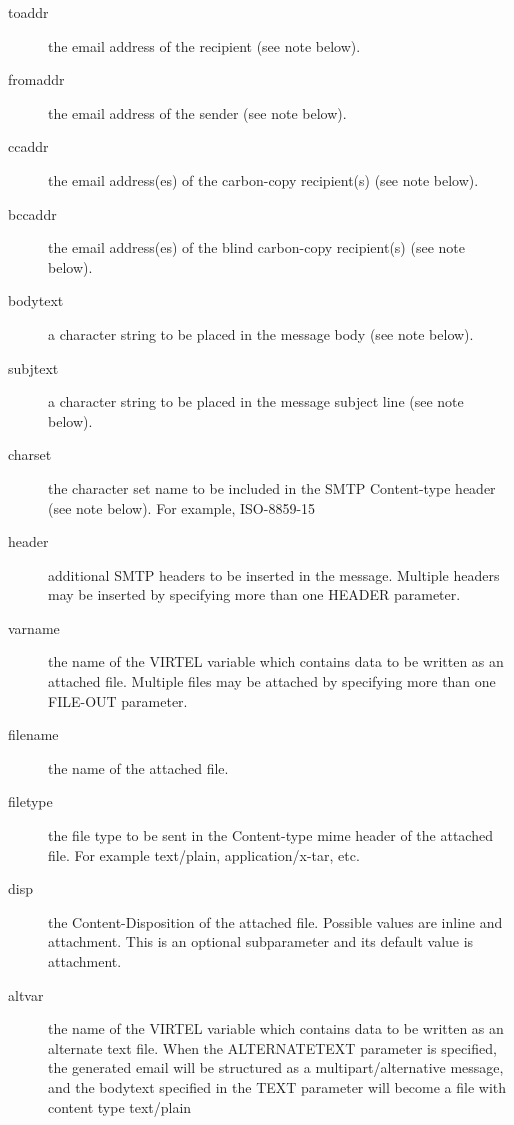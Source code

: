 \documentclass[letterpaper,10pt,english]{sphinxmanual}
\begin{document}
\begin{description}
\item[{toaddr}] \leavevmode
the email address of the recipient (see note below).

\item[{fromaddr}] \leavevmode
the email address of the sender (see note below).

\item[{ccaddr}] \leavevmode
the email address(es) of the carbon-copy recipient(s) (see note below).

\item[{bccaddr}] \leavevmode
the email address(es) of the blind carbon-copy recipient(s) (see note below).

\item[{bodytext}] \leavevmode
a character string to be placed in the message body (see note below).

\item[{subjtext}] \leavevmode
a character string to be placed in the message subject line (see note below).

\item[{charset}] \leavevmode
the character set name to be included in the SMTP Content-type header (see note below). For example, ISO-8859-15

\item[{header}] \leavevmode
additional SMTP headers to be inserted in the message. Multiple headers may be inserted by specifying more than one HEADER parameter.

\item[{varname}] \leavevmode
the name of the VIRTEL variable which contains data to be written as an attached file. Multiple files may be attached by specifying more than one FILE-OUT parameter.

\item[{filename}] \leavevmode
the name of the attached file.

\item[{filetype}] \leavevmode
the file type to be sent in the Content-type mime header of the attached file. For example text/plain, application/x-tar, etc.

\item[{disp}] \leavevmode
the Content-Disposition of the attached file. Possible values are inline and attachment. This is an optional subparameter and its default value is attachment.

\item[{altvar}] \leavevmode
the name of the VIRTEL variable which contains data to be written as an alternate text file. When the ALTERNATETEXT parameter is specified, the generated email will be structured as a multipart/alternative message, and the bodytext specified in the TEXT parameter will become a file with content type text/plain


\end{description}
\end{document}
